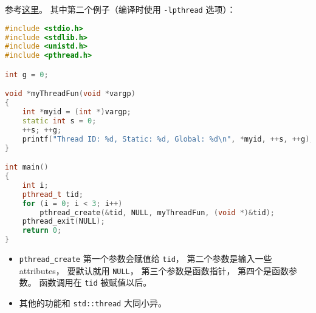 
\begin{issues}
\issueDraft
\end{issues}

参考\href{https://www.geeksforgeeks.org/multithreading-c-2/}{这里}。 其中第二个例子（编译时使用 \verb`-lpthread` 选项）：
\begin{lstlisting}[language=cpp]
#include <stdio.h>
#include <stdlib.h>
#include <unistd.h>
#include <pthread.h>

int g = 0;

void *myThreadFun(void *vargp)
{
	int *myid = (int *)vargp;
	static int s = 0;
	++s; ++g;
	printf("Thread ID: %d, Static: %d, Global: %d\n", *myid, ++s, ++g);
}

int main()
{
	int i;
	pthread_t tid;
	for (i = 0; i < 3; i++)
		pthread_create(&tid, NULL, myThreadFun, (void *)&tid);
	pthread_exit(NULL);
	return 0;
}
\end{lstlisting}

\begin{itemize}
\item \verb`pthread_create` 第一个参数会赋值给 \verb`tid`， 第二个参数是输入一些 attributes， 要默认就用 \verb`NULL`， 第三个参数是函数指针， 第四个是函数参数。 函数调用在 \verb`tid` 被赋值以后。
\item 其他的功能和 \verb`std::thread` 大同小异。
\end{itemize}


